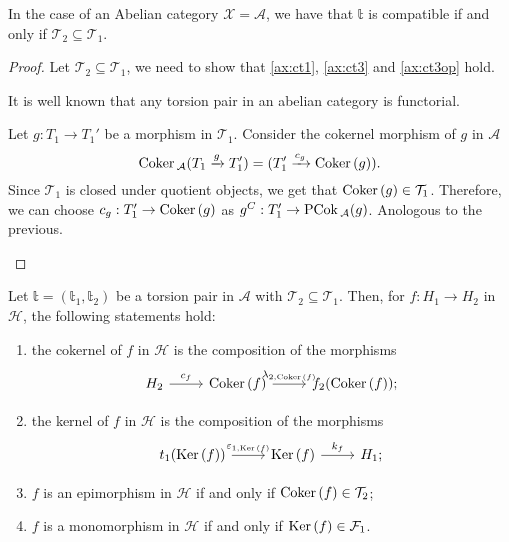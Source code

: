 \begin{rmk}\label{rmk:2.2}
  In the case of an Abelian category $\mathcal{X}=\mathcal{A}$, we have that
  $\mathbb{t}$ is compatible if and only if $\mathcal{T}_2\subseteq\mathcal{T}_1$.
\end{rmk}

\begin{proof}
  Let $\mathcal{T}_2\subseteq\mathcal{T}_1$, we need to show that \cref{ax:ct1},
  \cref{ax:ct3} and \cref{ax:ct3op} hold.
  \begin{torsionaxioms}
    \item It is well known that any torsion pair in an abelian category is functorial.
    \setcounter{enumi}{2}
    \item Let $g:T_1\to T_1'$ be a morphism in $\mathcal{T}_1$. Consider the cokernel morphism
    of $g$ in $\mathcal{A}$
    \begin{equation*}
      \mathrm{\textup{Coker\,}}_\mathcal{A}(T_1\xrightarrow{g}T_1')=(T_1'\xrightarrow{c_g}\mathrm{\textup{Coker\,}}(g)).
    \end{equation*}
    Since $\mathcal{T}_1$ is closed under quotient objects, we get that $\mathrm{\textup{Coker\,}}(g)\in\mathcal{T}_1$.
    Therefore, we can choose $c_g:T_1'\to\mathrm{\textup{Coker\,}}(g)$ as $g^C:T_1'\to\mathrm{\textup{PCok\,}}_\mathcal{A}(g)$.
    \varitem{^\ast} Anologous to the previous.
  \end{torsionaxioms}
\end{proof}

\begin{corollary}\label{cor:2.3}
  Let $\mathbb{t}=(\mathbb{t}_1,\mathbb{t}_2)$ be a torsion pair in $\mathcal{A}$ with $\mathcal{T}_2\subseteq\mathcal{T}_1$.
  Then, for $f:H_1\to H_2$ in $\mathcal{H}$, the following statements hold:
  \begin{enumerate}[label=(\alph*),ref=(\alph*)]
    \item\label{cor:2.3:a} the cokernel of $f$ in $\mathcal{H}$ is the composition of the morphisms
      \begin{equation*}
        \begin{tikzcd}
          H_2\arrow{r}{c_f}&\Coker(f)\arrow{r}{\lambda_{2,\Coker(f)}}&f_2(\Coker(f));
        \end{tikzcd}
      \end{equation*}
    \item\label{cor:2.3:b} the kernel of $f$ in $\mathcal{H}$ is the composition of the morphisms
      \begin{equation*}
        \begin{tikzcd}
          t_1(\Ker(f))\arrow{r}{\varepsilon_{1,\Ker(f)}}&\Ker(f)\arrow{r}{k_f}&H_1;
        \end{tikzcd}
      \end{equation*}
    \item\label{cor:2.3:c} $f$ is an epimorphism in $\mathcal{H}$ if and only if $\mathrm{\textup{Coker\,}}(f)\in\mathcal{T}_2$;
    \item\label{cor:2.3:d} $f$ is a monomorphism in $\mathcal{H}$ if and only if $\mathrm{\textup{Ker\,}}(f)\in\mathcal{F}_1$.
  \end{enumerate}
\end{corollary}

